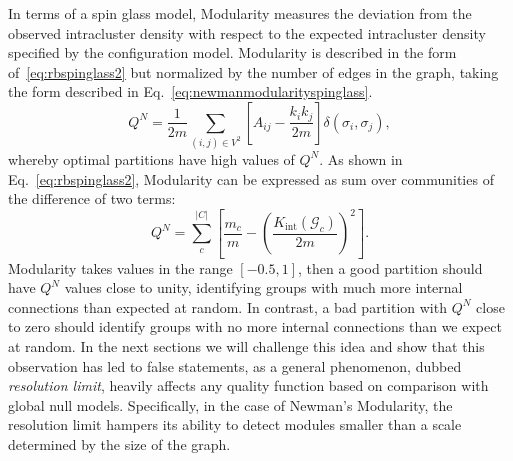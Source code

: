 In terms of a spin glass model, Modularity measures the deviation from the observed intracluster density with respect to the expected intracluster density specified by the configuration model. Modularity is described in the form of~\ref{eq:rbspinglass2} but normalized by the number of edges in the graph, taking the form described in Eq.~\ref{eq:newmanmodularityspinglass}.
\begin{equation}\label{eq:newmanmodularityspinglass}
Q^N =  \frac{1}{2m} \sum_{ (i,j) \in V^2} \left[ A_{ij} - \frac{k_i k_j}{2m} \right] \delta(\sigma_i,\sigma_j),
\end{equation}
whereby optimal partitions have high values of $Q^N$. As shown in Eq.~\ref{eq:rbspinglass2}, Modularity can be expressed as sum over communities of the difference of two terms:
\begin{equation}\label{eq:newmanmodularity}
Q^N = \sum_{c}^{|C|} \left[ \frac{m_c}{m} - \left( \frac{K_{\textrm{int}}(\mathcal{G}_c)}{2m} \right)^2 \right].
\end{equation}
Modularity takes values in the range $[-0.5,1]$, then a good partition should have $Q^N$ values close to unity, identifying groups with much more internal connections than expected at random. In contrast, a bad partition with $Q^N$ close to zero should identify groups with no more internal connections than we expect at random.
In the next sections we will challenge this idea and show that this observation has led to false statements, as a general phenomenon, dubbed \emph{resolution limit}, heavily affects any quality function based on comparison with global null models.
Specifically, in the case of Newman's Modularity, the resolution limit hampers its ability to detect modules smaller than a scale determined by the size of the graph.

